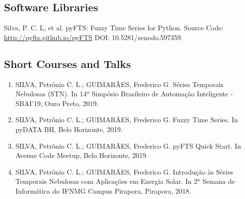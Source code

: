 \subsection{Software Libraries}

Silva, P. C. L, et al. pyFTS: Fuzzy Time Series for Python. Source Code: \url{http://pyfts.github.io/pyFTS} DOI: 10.5281/zenodo.597359. 

\subsection{Short Courses and Talks}

\begin{enumerate}
    \item SILVA, Petrônio C. L.; GUIMARÃES, Frederico G. Séries Temporais Nebulosas (STN). In 14º Simpósio Brasileiro de Automação Inteligente - SBAI'19, Ouro Preto, 2019.
    \item SILVA, Petrônio C. L.; GUIMARÃES, Frederico G. Fuzzy Time Series. In pyDATA BH, Belo Horizonte, 2019.
    \item SILVA, Petrônio C. L.; GUIMARÃES, Frederico G. pyFTS Quick Start. In Avenue Code Meetup, Belo Horizonte, 2019.
    \item SILVA, Petrônio C. L.; GUIMARÃES, Frederico G. Introdução às Séries Temporais Nebulosas com Aplicações em Energia Solar. In 2$^a$ Semana de Informática do IFNMG Campus Pirapora, Pirapora, 2018.
\end{enumerate}


